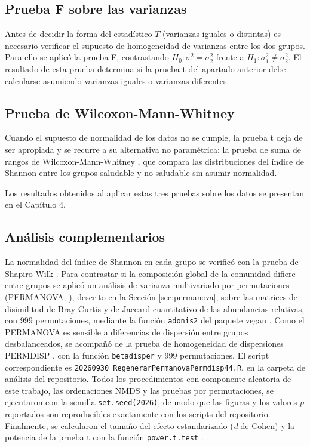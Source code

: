\subsection{Prueba F sobre las varianzas}

Antes de decidir la forma del estadístico $T$ (varianzas iguales o distintas) es necesario verificar
el supuesto de homogeneidad de varianzas entre los dos grupos. Para ello se aplicó la prueba F,
contrastando $H_0: \sigma_1^2 = \sigma_2^2$ frente a $H_1: \sigma_1^2 \neq \sigma_2^2$. El resultado de
esta prueba determina si la prueba t del apartado anterior debe calcularse asumiendo varianzas iguales
o varianzas diferentes.

\subsection{Prueba de Wilcoxon-Mann-Whitney}

Cuando el supuesto de normalidad de los datos no se cumple, la prueba t deja de ser apropiada y se
recurre a su alternativa no paramétrica: la prueba de suma de rangos de Wilcoxon-Mann-Whitney \citep{mann1947test}, que
compara las distribuciones del índice de Shannon entre los grupos saludable y no saludable sin asumir
normalidad.

Los resultados obtenidos al aplicar estas tres pruebas sobre los datos se presentan en el Capítulo 4.

\subsection{Análisis complementarios}
\label{sec:met-complementarios-pruebas}

La normalidad del índice de Shannon en cada grupo se verificó con la prueba de Shapiro-Wilk
\citep{shapiro1965analysis}. Para contrastar si la composición global de la comunidad difiere entre
grupos se aplicó un análisis de varianza multivariado por permutaciones (PERMANOVA;
\citealp{anderson2001new, anderson2011navigating}), descrito en la Sección \ref{sec:permanova}, sobre las
matrices de disimilitud de Bray-Curtis y de Jaccard cuantitativo de las abundancias relativas, con 999
permutaciones, mediante la función \texttt{adonis2} del paquete vegan
\citep{oksanen2022vegan}. Como el PERMANOVA es sensible a diferencias de dispersión entre grupos
desbalanceados, se acompañó de la prueba de homogeneidad de dispersiones PERMDISP
\citep{anderson2006distance}, con la función \texttt{betadisper} y 999 permutaciones. El script
correspondiente es \texttt{20260930\_RegenerarPermanovaPermdisp44.R}, en la carpeta de análisis del
repositorio. Todos los procedimientos con componente aleatoria de este trabajo, las ordenaciones NMDS
y las pruebas por permutaciones, se ejecutaron con la semilla \texttt{set.seed(2026)}, de modo que
las figuras y los valores $p$ reportados son reproducibles exactamente con los scripts del repositorio. Finalmente, se calcularon el tamaño del efecto estandarizado (\emph{d} de
Cohen) y la potencia de la prueba t con la función \texttt{power.t.test}
\citep{cohen1988statistical, xia2018statistical}.


